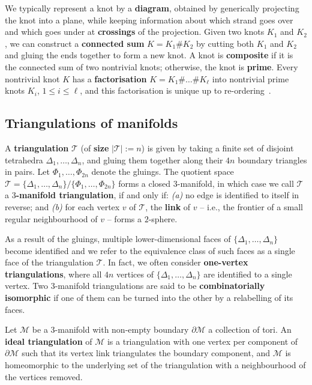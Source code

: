 \documentclass[a4paper,UKenglish,cleveref, autoref, thm-restate]{lipics-v2021}
\newcommand{\tri}{\mathcal{T}}
\newcommand{\manifold}{\mathcal{M}}
\begin{document}
We typically represent a knot by a \textbf{diagram}, obtained by generically projecting the knot into a plane,
while keeping information about which strand goes over and which goes under at \textbf{crossings} of the projection.
Given two knots $K_1$ and $K_2$, we can construct a \textbf{connected sum} $K= K_1 \# K_2$ by cutting both $K_1$ and $K_2$ and gluing the ends together to form a new knot.
A knot is \textbf{composite} if it is the connected sum of two nontrivial knots;
otherwise, the knot is \textbf{prime}.
Every nontrivial knot $K$ has a \textbf{factorisation} $K = K_1 \# \ldots \# K_\ell$ into
nontrivial prime knots $K_i$, $1\leqslant i \leqslant \ell$, and this factorisation is unique up to re-ordering~\cite{schubert49unique}.

\subsection{Triangulations of manifolds}\label{ssec:triangulations}

A \textbf{triangulation} $\tri$ (of \textbf{size} $|\tri|:=n$) is given by taking a finite set of disjoint tetrahedra $\Delta_1, \ldots , \Delta_n$, and gluing them
together along their $4n$ boundary triangles in pairs.
Let $\Phi_1 , \ldots , \Phi_{2n}$ denote the gluings. The quotient space
$\tri = \{\Delta_1, \ldots , \Delta_n\} / \{\Phi_1 , \ldots , \Phi_{2n}\}$
forms a closed $3$-manifold, in which case we call $\tri$ a \textbf{$3$-manifold triangulation}, if and only if: \emph{(a)} no edge is identified to itself in reverse;
and \emph{(b)} for each vertex $v$ of $\tri$, the \textbf{link} of $v$ -- i.e.,
the frontier of a small regular neighbourhood of $v$ -- forms a $2$-sphere.

As a result of the gluings, multiple lower-dimensional faces of  $\{\Delta_1, \ldots , \Delta_n\}$ become identified and we refer to the equivalence class of such faces as a single face of the triangulation $\tri$.
In fact, we often consider \textbf{one-vertex triangulations}, where all $4n$ vertices of $\{\Delta_1, \ldots , \Delta_n\}$ are identified to a single vertex. Two $3$-manifold triangulations are said to be {\bf combinatorially isomorphic} if one of them can be turned into the other by a relabelling of its faces.

Let $\manifold$ be a $3$-manifold with non-empty boundary $\partial \manifold$ a collection of tori. An {\bf ideal triangulation} of $\manifold$ is a triangulation with one vertex per component of $\partial \manifold$ such that its vertex link triangulates the boundary component, and $\manifold $ is homeomorphic to the underlying set of the triangulation with a neighbourhood of the vertices removed.
\end{document}
